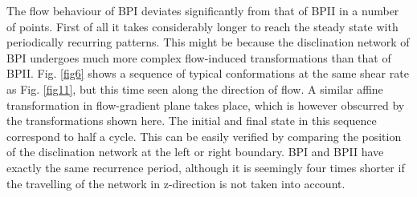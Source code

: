 \documentclass[aps,pre,reprint,superscriptaddress]{revtex4}
\begin{document}
The flow behaviour of BPI deviates significantly from that of BPII in a number of points.
First of all it takes considerably longer to reach the steady state with periodically recurring patterns.
This might be because the disclination network of BPI undergoes much more complex flow-induced transformations than that of BPII.
Fig. \ref{fig6} shows a sequence of typical conformations at the same shear rate as Fig. \ref{fig11}, but this time seen along the direction of flow.
A similar affine transformation in flow-gradient plane takes place, which is however obscurred by the transformations shown here. 
The initial and final state in this sequence correspond to half a cycle. 
This can be easily verified by comparing the position of the disclination network at the left or right boundary.
BPI and BPII have exactly the same recurrence period, although it is seemingly four times shorter if the travelling of the network in z-direction is not taken into account.  
\end{document}
